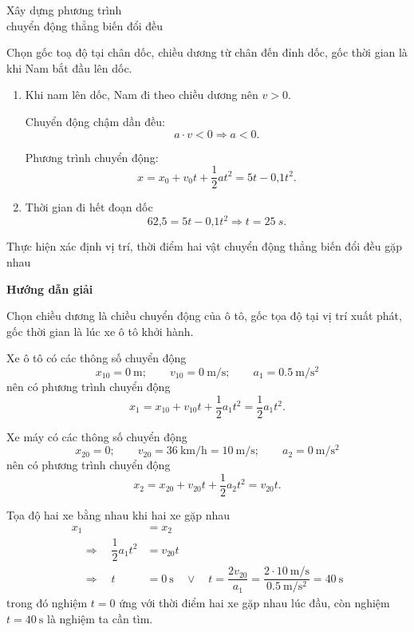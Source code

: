 \begin{dang}{Xây dựng phương trình\\ chuyển động thẳng biến đổi đều}
{		Chọn gốc toạ độ tại chân dốc, chiều dương từ chân đến đỉnh dốc, gốc thời gian là khi Nam bắt đầu lên dốc.
		\begin{enumerate}[label=\alph*.]
			\item Khi nam lên dốc, Nam đi theo chiều dương nên $v>0$.
			
			Chuyển động chậm dần đều: 
			$$a\cdot v<0 \Rightarrow a<0.$$
			
			Phương trình chuyển động:
			$$x =x_0 +v_0t+\dfrac{1}{2}at^2 = 5t - \text{0,1}t^2.$$
			\item Thời gian đi hết đoạn dốc
			$$\text{62,5} =5t - \text{0,1}t^2 \Rightarrow t = \SI{25}{s}.$$
		\end{enumerate}
	}
\end{dang}

\begin{dang}{Thực hiện xác định vị trí, thời điểm hai vật chuyển động thẳng biến đổi đều gặp nhau}
	{	\begin{center}
			\textbf{Hướng dẫn giải}
		\end{center}
	Chọn chiều dương là chiều chuyển động của ô tô, gốc tọa độ tại vị trí xuất phát, gốc thời gian là lúc xe ô tô khởi hành.
		 	
		 	Xe ô tô có các thông số chuyển động 
		 	$$x_{10} = \SI{0}{\meter};\qquad  v_{10} = \SI{0}{\meter/\second};\qquad a_1 = \SI{0.5}{\meter
		 	/\second^{2}}$$	
		 	nên có phương trình chuyển động 
		 	$$x_1 = x_{10}+v_{10}t+\dfrac{1}{2}a_{1}t^{2}=\dfrac{1}{2}a_1t^2.$$
		 	
		 	Xe máy có các thông số chuyển động 
		 	$$x_{20} = 0;\qquad v_{20} =\SI{36}{\kilo\meter/\hour}=\SI{10}{\meter/\second};\qquad a_{2} = \SI{0}{\meter/\second^{2}}$$	
		 	nên có phương trình chuyển động 
		 	$$x_2 =x_{20}+v_{20}t+\dfrac{1}{2}a_2t^2=v_{20}t.$$
		 	
		 	Tọa độ hai xe bằng nhau khi hai xe gặp nhau
		 	\begin{align*}
		 		x_1&=x_2\\
		 		\quad\Rightarrow\quad \dfrac{1}{2}a_1t^2&=v_{20}t\\
		 		\quad\Rightarrow\quad t&=\SI{0}{\second} \quad\vee\quad t=\dfrac{2v_{20}}{a_1}=\dfrac{2\cdot\SI{10}{\meter/\second}}{\SI{0.5}{\meter/\second^{2}}}=\SI{40}{\second}
		 	\end{align*} 
		 	trong đó nghiệm $t=0$ ứng với thời điểm hai xe gặp nhau lúc đầu, còn nghiệm $t=\SI{40}{\second}$ là nghiệm ta cần tìm. 
		 	
}
\end{dang}
